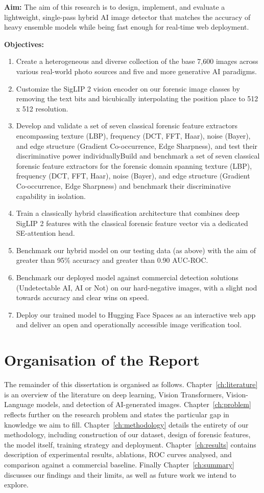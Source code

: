 \textbf{Aim:} The aim of this research is to design, implement, and evaluate a lightweight, single-pass hybrid AI image detector that matches the accuracy of heavy ensemble models while being fast enough for real-time web deployment.

\textbf{Objectives:}
\begin{enumerate}
    \item Create a heterogeneous and diverse collection of the base 7,600 images across various real-world photo sources and five and more generative AI paradigms.
    \item Customize the SigLIP 2 vision encoder on our forensic image classes by removing the text bits and bicubically interpolating the position place to 512 x 512 resolution.
    \item Develop and validate a set of seven classical forensic feature extractors encompassing texture (LBP), frequency (DCT, FFT, Haar), noise (Bayer), and edge structure (Gradient Co-occurrence, Edge Sharpness), and test their discriminative power individuallyBuild and benchmark a set of seven classical forensic feature extractors for the forensic domain spanning texture (LBP), frequency (DCT, FFT, Haar), noise (Bayer), and edge structure (Gradient Co-occurrence, Edge Sharpness) and benchmark their discriminative capability in isolation.
    \item Train a classically hybrid classification architecture that combines deep SigLIP 2 features with the classical forensic feature vector via a dedicated SE-attention head.
    \item Benchmark our hybrid model on our testing data (as above) with the aim of greater than 95\% accuracy and greater than 0.90 AUC-ROC.
    \item Benchmark our deployed model against commercial detection solutions (Undetectable AI, AI or Not) on our hard-negative images, with a slight nod towards accuracy and clear wins on speed.
    \item Deploy our trained model to Hugging Face Spaces as an interactive web app and deliver an open and operationally accessible image verification tool.
\end{enumerate}

\section{Organisation of the Report}

The remainder of this dissertation is organised as follows. Chapter~\ref{ch:literature} is an overview of the literature on deep learning, Vision Transformers, Vision-Language models, and detection of AI-generated images. Chapter~\ref{ch:problem} reflects further on the research problem and states the particular gap in knowledge we aim to fill. Chapter~\ref{ch:methodology} details the entirety of our methodology, including construction of our dataset, design of forensic features, the model itself, training strategy and deployment. Chapter~\ref{ch:results} contains description of experimental results, ablations, ROC curves analysed, and comparison against a commercial baseline. Finally Chapter~\ref{ch:summary} discusses our findings and their limits, as well as future work we intend to explore.
